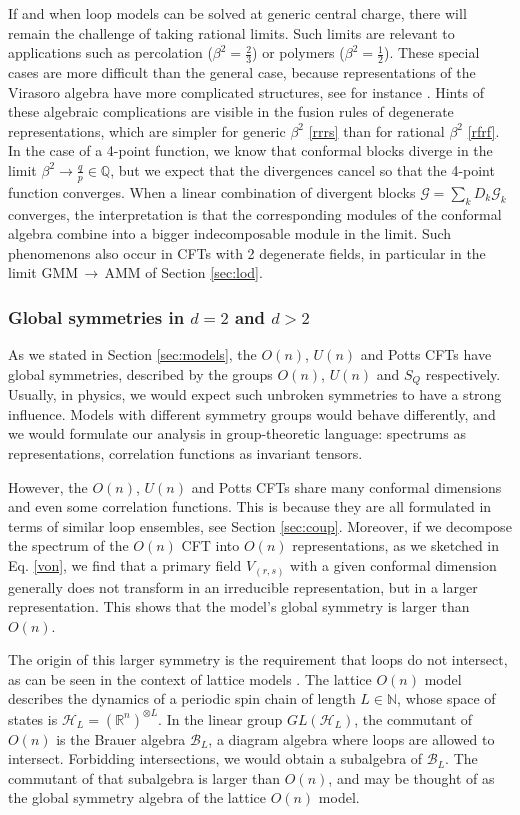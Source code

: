\documentclass[12pt, a4paper]{article}
\theoremstyle{break}
\begin{document}
If and when loop models can be solved at generic central charge, there will remain the challenge of taking rational limits. Such limits are relevant to applications such as percolation ($\beta^2=\frac23$) or polymers ($\beta^2=\frac12$). These special cases are more difficult than the general case, because representations of the Virasoro algebra have more complicated structures, see for instance \cite{hs21}. Hints of these algebraic complications are visible in the fusion rules of degenerate representations, which are simpler for generic $\beta^2$ \eqref{rrrs} than for rational $\beta^2$ \eqref{rfrf}. In the case of a 4-point function, we know that conformal blocks diverge in the limit $\beta^2\to \frac{q}{p}\in\mathbb{Q}$, but we expect that the divergences cancel so that the 4-point function converges. When a linear combination of divergent blocks $\mathcal{G} = \sum_k D_k \mathcal{G}_k$ converges, the interpretation is that the corresponding modules of the conformal algebra combine into a bigger indecomposable module in the limit. Such phenomenons also occur in CFTs with 2 degenerate fields, in particular in the limit GMM\,$\to$\,AMM of Section \ref{sec:lod}. 

\subsubsection{Global symmetries in $d=2$ and $d>2$}

As we stated in Section \ref{sec:models}, the $O(n)$, $U(n)$ and Potts CFTs have global symmetries, described by the groups $O(n)$, $U(n)$ and $S_Q$ respectively. Usually, in physics, we would expect such unbroken symmetries to have a strong influence. Models with different symmetry groups would behave differently, and we would formulate our analysis in group-theoretic language: spectrums as representations, correlation functions as invariant tensors. 

However, the $O(n)$, $U(n)$ and Potts CFTs share many conformal dimensions and even some correlation functions.
This is because they are all formulated in terms of similar loop ensembles, see Section \ref{sec:coup}.
Moreover, if we decompose the spectrum of the $O(n)$ CFT into $O(n)$ representations, as we sketched in Eq. \eqref{von}, we find that a primary field $V_{(r,s)}$ with a given conformal dimension generally does not transform in an irreducible representation, but in a larger representation. This shows that the model's global symmetry is larger than $O(n)$. 

The origin of this larger symmetry is the requirement that loops do not intersect, as can be seen in the context of lattice models \cite{jrs22}. The lattice $O(n)$ model describes the dynamics of a periodic spin chain of length $L\in\mathbb{N}$, whose space of states is $\mathcal{H}_L=\left(\mathbb{R}^n\right)^{\otimes L}$. In the linear group $GL(\mathcal{H}_L)$, the commutant of $O(n)$ is the Brauer algebra $\mathcal{B}_L$, a diagram algebra where loops are allowed to intersect. Forbidding intersections, we would obtain a subalgebra of $\mathcal{B}_L$. The commutant of that subalgebra is larger than $O(n)$, and may be thought of as the global symmetry algebra of the lattice $O(n)$ model.
\end{document}
